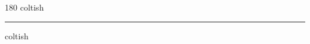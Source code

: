 
\begin{frame}
\begin{center}
\begin{turn}{180}
{\fontsize{2.5cm}{1em}\selectfont coltish}
\end{turn}
\vspace{1em}\par  
\hrule
\vspace{1em}\par  
{\fontsize{2.5cm}{1em}\selectfont coltish}
\end{center}
\end{frame}
